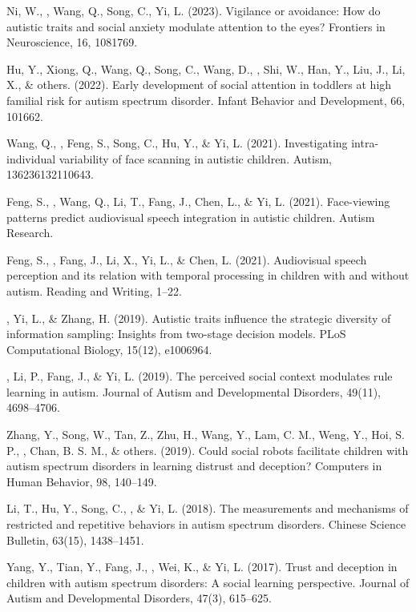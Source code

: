 

\begin{etaremune}
  \item Ni, W., \ME, Wang, Q., Song, C., Yi, L. (2023). Vigilance or avoidance: How do autistic traits and social anxiety modulate attention to the eyes? Frontiers in Neuroscience, 16, 1081769.
  \item Hu, Y., Xiong, Q., Wang, Q., Song, C., Wang, D., \ME, Shi, W., Han, Y., Liu, J., Li, X., \& others. (2022). Early development of social attention in toddlers at high familial risk for autism spectrum disorder. Infant Behavior and Development, 66, 101662.
  \item Wang, Q., \ME, Feng, S., Song, C., Hu, Y., \& Yi, L. (2021). Investigating intra-individual variability of face scanning in autistic children. Autism, 136236132110643.
  \item Feng, S., \ME, Wang, Q., Li, T., Fang, J., Chen, L., \& Yi, L. (2021). Face-viewing patterns predict audiovisual speech integration in autistic children. Autism Research.
  \item Feng, S., \ME, Fang, J., Li, X., Yi, L., \& Chen, L. (2021). Audiovisual speech perception and its relation with temporal processing in children with and without autism. Reading and Writing, 1–22.
  \item \ME, Yi, L., \& Zhang, H. (2019). Autistic traits influence the strategic diversity of information sampling: Insights from two-stage decision models. PLoS Computational Biology, 15(12), e1006964.
  \item \ME, Li, P., Fang, J., \& Yi, L. (2019). The perceived social context modulates rule learning in autism. Journal of Autism and Developmental Disorders, 49(11), 4698–4706.
  \item Zhang, Y., Song, W., Tan, Z., Zhu, H., Wang, Y., Lam, C. M., Weng, Y., Hoi, S. P., \ME, Chan, B. S. M., \& others. (2019). Could social robots facilitate children with autism spectrum disorders in learning distrust and deception? Computers in Human Behavior, 98, 140–149.
  \item Li, T., Hu, Y., Song, C., \ME, \& Yi, L. (2018). The measurements and mechanisms of restricted and repetitive behaviors in autism spectrum disorders. Chinese Science Bulletin, 63(15), 1438–1451.
  \item Yang, Y., Tian, Y., Fang, J., \ME, Wei, K., \& Yi, L. (2017). Trust and deception in children with autism spectrum disorders: A social learning perspective. Journal of Autism and Developmental Disorders, 47(3), 615–625.

\end{etaremune}
